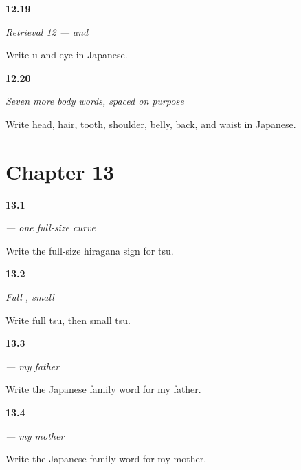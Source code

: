 \noindent\begin{minipage}[t]{\linewidth}
\raggedright
\hypertarget{review-JA-R12-body-01-card}{\textbf{12.19}} \emph{Retrieval 12 —  and }\par
\small Write u and eye in Japanese.
\end{minipage}\par\medskip

\noindent\begin{minipage}[t]{\linewidth}
\raggedright
\hypertarget{review-JA-C12-body-map-two-dictation}{\textbf{12.20}} \emph{Seven more body words, spaced on purpose}\par
\small Write head, hair, tooth, shoulder, belly, back, and waist in Japanese.
\end{minipage}\par\medskip

\section*{Chapter 13}

\noindent\begin{minipage}[t]{\linewidth}
\raggedright
\hypertarget{review-JA-W13-tsu-write}{\textbf{13.1}} \emph{ — one full-size curve}\par
\small Write the full-size hiragana sign for tsu.
\end{minipage}\par\medskip

\noindent\begin{minipage}[t]{\linewidth}
\raggedright
\hypertarget{review-JA-R13-tsu-contrast-recall}{\textbf{13.2}} \emph{Full , small }\par
\small Write full tsu, then small tsu.
\end{minipage}\par\medskip

\noindent\begin{minipage}[t]{\linewidth}
\raggedright
\hypertarget{review-JA-C13-chichi-recall}{\textbf{13.3}} \emph{ — my father}\par
\small Write the Japanese family word for my father.
\end{minipage}\par\medskip

\noindent\begin{minipage}[t]{\linewidth}
\raggedright
\hypertarget{review-JA-C13-haha-recall}{\textbf{13.4}} \emph{ — my mother}\par
\small Write the Japanese family word for my mother.
\end{minipage}\par\medskip

